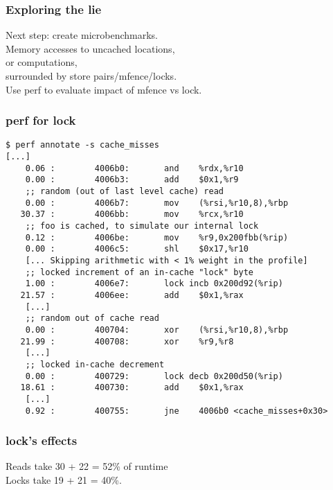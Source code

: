 \begin{frame}
  \frametitle{Exploring the lie}

  
    Next step: create microbenchmarks.\\[1em]
    Memory accesses to uncached locations,\\
    or computations,\\[1em]
    surrounded by store pairs/mfence/locks.\\[1em]
    Use perf to evaluate impact of mfence vs lock.
  

\end{frame}

\begin{frame}[fragile]
  \frametitle{perf for lock}

    \begin{lstlisting}
$ perf annotate -s cache_misses
[...]
    0.06 :        4006b0:       and    %rdx,%r10
    0.00 :        4006b3:       add    $0x1,%r9
    ;; random (out of last level cache) read
    0.00 :        4006b7:       mov    (%rsi,%r10,8),%rbp
   30.37 :        4006bb:       mov    %rcx,%r10
    ;; foo is cached, to simulate our internal lock
    0.12 :        4006be:       mov    %r9,0x200fbb(%rip)
    0.00 :        4006c5:       shl    $0x17,%r10
    [... Skipping arithmetic with < 1% weight in the profile]
    ;; locked increment of an in-cache "lock" byte
    1.00 :        4006e7:       lock incb 0x200d92(%rip)
   21.57 :        4006ee:       add    $0x1,%rax
    [...]
    ;; random out of cache read
    0.00 :        400704:       xor    (%rsi,%r10,8),%rbp
   21.99 :        400708:       xor    %r9,%r8
    [...]
    ;; locked in-cache decrement
    0.00 :        400729:       lock decb 0x200d50(%rip)
   18.61 :        400730:       add    $0x1,%rax
    [...]
    0.92 :        400755:       jne    4006b0 <cache_misses+0x30>
    \end{lstlisting}


\end{frame}

\begin{frame}
  \frametitle{lock's effects}

  
    Reads take 30 + 22 = 52\% of runtime\\
    Locks take 19 + 21 = 40\%.
  

\end{frame}

